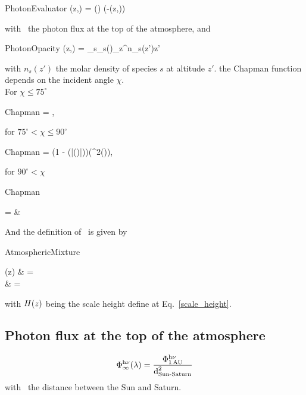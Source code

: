 \begin{equationCode}{PhotonEvaluator}
\fhv(z,\lambda) = \fhvtop(\lambda) \exp\left(-\tau(z,\lambda)\right)
\end{equationCode}
with \fhvtop\ the photon flux at the top of the atmosphere, and
\begin{equationCode}{PhotonOpacity}
\tau(z,\lambda) = \chapman\sum_s\sigma_s(\lambda)\int_z^\infty n_s(z')\dd z'
\end{equationCode}
with $n_s(z')$ the molar density of species $s$ at altitude $z'$.
the Chapman function depends on the
incident angle $\chi$.\\
For $\chi \le 75^\circ$
\begin{equationCode}{Chapman}
\chapman =  ,
\end{equationCode}
for $75^\circ < \chi \le 90^\circ$
\begin{equationCode}{Chapman}
\chapman =  
                \left(1 - \erf\left(|\cos(\chi)|\right)\right)\exp\left(\cos^2(\chi)\right),
\end{equationCode}
for $90^\circ < \chi$
\begin{equationCode}{Chapman}
\begin{split}
\chapman = & \sqrt{2\pi \x}
\end{split}
\end{equationCode}
And the definition of \x\ is given by
\begin{equationCode}{AtmosphericMixture}
\begin{split}
\x(z)   &     =  \\
\nounit & \uu = \frac{[km]}{[km]}
\end{split}
\end{equationCode}
with $H(z)$ being the scale height define at Eq.~\ref{scale_height}.

\subsection{Photon flux at the top of the atmosphere}
\begin{equation}
\Phi^{\mathrm{h}\nu}_\infty(\lambda) = \frac{\Phi^{\mathrm{h}\nu}_\text{1\,AU}}{\text{d}_\text{Sun-Saturn}^2}
\end{equation}
with \dSS\ the distance between the Sun and Saturn.

